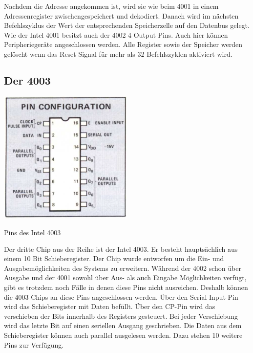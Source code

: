  Nachdem die Adresse angekommen ist, wird sie wie beim 4001 in einem Adressenregister zwischengespeichert und dekodiert. Danach wird im nächsten Befehlszyklus der Wert der entsprechenden Speicherzelle auf den Datenbus gelegt. Wie der Intel 4001 besitzt auch der 4002 4 Output Pins. Auch hier können Peripheriegeräte angeschlossen werden. Alle Register sowie der Speicher werden gelöscht wenn das Reset-Signal für mehr als 32 Befehlszyklen aktiviert wird.

\subsection{Der 4003}
 \begin{floatingfigure}[r]{.5\textwidth}
 	\vspace{-10pt}
 	\includegraphics[width=0.5\textwidth]{figures/pins_4003.png}
 	\caption{Pins des Intel 4003}
 	\label{fig:pins_4003}
 \end{floatingfigure}
Der dritte Chip aus der Reihe ist der Intel 4003. Er besteht hauptsächlich aus einem 10 Bit Schieberegister. Der Chip wurde entworfen um die Ein- und Ausgabemöglichkeiten des Systems zu erweitern. Während der 4002 schon über Ausgabe und der 4001 sowohl über Aus- als auch Eingabe Möglichkeiten verfügt, gibt es trotzdem noch Fälle in denen diese Pins nicht ausreichen. Deshalb können die 4003 Chips an diese Pins angeschlossen werden. Über den Serial-Input Pin wird das Schieberegister mit Daten befüllt. Über den CP-Pin wird das verschieben der Bits innerhalb des Registers gesteuert. Bei jeder Verschiebung wird das letzte Bit auf einen seriellen Ausgang geschrieben. Die Daten aus dem Schieberegister können auch parallel ausgelesen werden. Dazu stehen 10 weitere Pins zur Verfügung.

